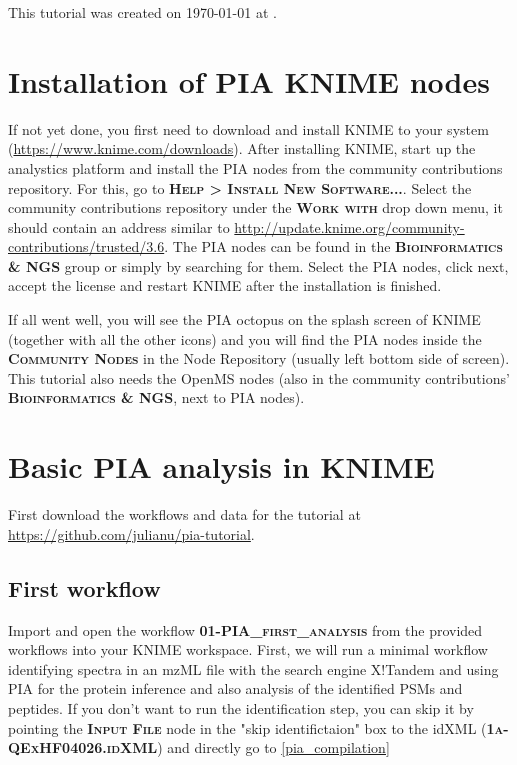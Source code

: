 \documentclass[a4paper,11pt,twoside]{article}
\newcommand{\menu}[1]{{\scshape\bfseries #1}}
\newcommand{\filepath}[1]{{\scshape\bfseries #1}}
\newcommand{\knimenode}[1]{{\scshape\bfseries #1}}
\begin{document}
This tutorial was created on \today{} at \currenttime{}.


\newpage
\section{Installation of PIA KNIME nodes}

If not yet done, you first need to download and install KNIME to your system
(\url{https://www.knime.com/downloads}). After installing KNIME, start up the
analystics platform and install the PIA nodes from the community contributions
repository. For this, go to \menu{Help > Install New Software...}. Select the
community contributions repository under the \menu{Work with} drop down menu, it
should contain an address similar to
\url{http://update.knime.org/community-contributions/trusted/3.6}. The PIA nodes
can be found in the \menu{Bioinformatics \& NGS} group or simply by searching
for them. Select the PIA nodes, click next, accept the license and restart KNIME
after the installation is finished.

If all went well, you will see the PIA octopus on the splash screen of KNIME
(together with all the other icons) and you will find the PIA nodes inside the
\menu{Community Nodes} in the Node Repository (usually left bottom side of
screen). This tutorial also needs the OpenMS nodes (also in the community
contributions' \menu{Bioinformatics \& NGS}, next to PIA nodes).


\newpage
\section{Basic PIA analysis in KNIME}

First download the workflows and data for the tutorial at
\url{https://github.com/julianu/pia-tutorial}.


\subsection{First workflow}

Import and open the workflow \filepath{01-PIA\_first\_analysis} from the
provided workflows into your KNIME workspace. First, we will run a minimal
workflow identifying spectra in an mzML file with the search engine X!Tandem
and using PIA for the protein inference and also analysis of the identified
PSMs and peptides. If you don't want to run the identification step, you can
skip it by pointing the \knimenode{Input File} node in the "skip
identifictaion" box to the idXML (\filepath{1a-QExHF04026.idXML}) and directly
go to \ref{pia_compilation}
\end{document}
